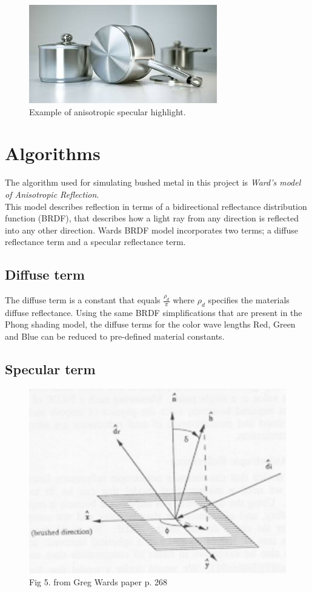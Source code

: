 \documentclass{acmsiggraph}               %
\begin{document}
\begin{figure}[!ht]
    \centering
    \includegraphics[width=0.7\columnwidth]{highlight.jpg}
    \caption{Example of anisotropic specular highlight.}
    \label{anisotropic_highlight}
\end{figure}

\section{Algorithms}
The algorithm used for simulating bushed metal in this project is \textit{Ward's model of
Anisotropic Reflection}\cite{GregWard}. \\

This model describes reflection in terms of a bidirectional reflectance
distribution function (BRDF), that describes how a light ray from any direction
is reflected into any other direction. Wards BRDF model incorporates two terms;
a diffuse reflectance term and a specular reflectance term.

\subsection{Diffuse term}

The diffuse term is a constant that equals $\frac{\rho_d}{\pi}$ where $\rho_d$
specifies the materials diffuse reflectance. Using the same BRDF
simplifications that are present in the Phong shading model, the diffuse terms
for the color wave lengths Red, Green and Blue can be reduced to pre-defined
material constants.

\subsection{Specular term}

\begin{figure}[!ht]
    \centering
    \includegraphics[width=0.7\columnwidth]{figure.png}
    \caption{Fig 5. from Greg Wards paper p. 268}
    \label{figure}
\end{figure}
\end{document}
